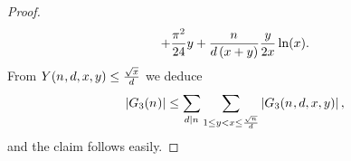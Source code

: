 \begin{proof}
\begin{align*}
      +
      \frac{\pi^2}{24}\RightA
      +
        \frac{\Size}{\TheDivisor\Parens{\LeftA+\RightA}}
        \frac{\RightA}{2\LeftA}\LogOf{\LeftA}
        .
    \end{align*}
    From
    $Y(n_{},d,x,y)
    \leq
    \frac{\sqrt{x}}{d}$
    we deduce
    \[
      \AbsValueOf{\TheQuantityOf[3]{\Size}}
      \leq
      \Sum[\TheDivisor\divides\Size]{
        \Sum[{
          1\leq\RightA<\LeftA\leq\frac{\SqrtOf{\Size}}{\TheDivisor}
        }]{
          \AbsValueOf{\TheQuantityOf[3]{\Size,\TheDivisor,\LeftA,\RightA}}
        }
      }
      ,
    \]
    and the claim follows easily. 
  \end{proof}

